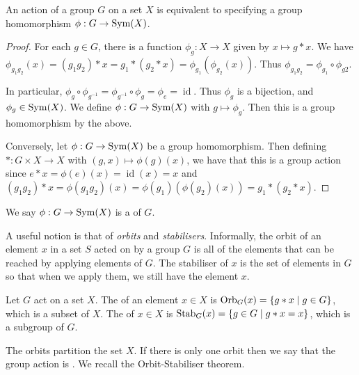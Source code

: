 \documentclass[a4paper]{scrreprt}
\begin{document}
\begin{proposition}
	An action of a group $G$ on a set $X$ is equivalent to specifying a group homomorphism $\phi: G \rightarrow \operatorname{Sym}(X)$.
\end{proposition}
\begin{proof}
	For each $g \in G$, there is a function $\phi_g : X \rightarrow X$ given by $x \mapsto g * x$. We have $\phi_{g_1 g_2}(x) = (g_1 g_2) * x = g_1 * (g_2 * x) = \phi_{g_1} (\phi_{g_2}(x))$. Thus $\phi_{g_1 g_2} = \phi_{g_1} \circ \phi_{g2}$.
	
	In particular, $\phi_g \circ \phi_{g^{-1}} = \phi_{g^{-1}} \circ \phi_g = \phi_e = \operatorname{id}$. Thus $\phi_g$ is a bijection, and $\phi_g \in \operatorname{Sym}(X)$. We define $\phi : G \rightarrow \operatorname{Sym}(X)$ with $g \mapsto \phi_g$. Then this is a group homomorphism by the above.
	
	Conversely, let $\phi : G \rightarrow \operatorname{Sym}(X)$ be a group homomorphism. Then defining $*: G \times X \rightarrow X$ with $(g, x) \mapsto \phi(g)(x)$, we have that this is a group action since $e * x = \phi(e)(x) = \operatorname{id}(x) = x$ and $(g_1 g_2) * x = \phi(g_1 g_2)(x) = \phi(g_1)(\phi(g_2)(x)) = g_1 * (g_2 * x)$.
\end{proof}

\begin{definition}
	We say $\phi: G \rightarrow \operatorname{Sym}(X)$ is a  of $G$.
\end{definition}


A useful notion is that of \emph{orbits} and \emph{stabilisers}. Informally, the orbit of an element $x$ in a set $S$ acted on by a group $G$ is all of the elements that can be reached by applying elements of $G$. The stabiliser of $x$ is the set of elements in $G$ so that when we apply them, we still have the element $x$.

\begin{definition}
	Let $G$ act on a set $X$. The  of an element $x \in X$ is $\operatorname{Orb}_G(x) = \{ g * x \mid g \in G \}$, which is a subset of $X$. The  of $x \in X$ is $\operatorname{Stab}_G(x) = \{ g \in G \mid g * x = x \}$, which is a subgroup of $G$.
\end{definition}

The orbits partition the set $X$. If there is only one orbit then we say that the group action is .
We recall the Orbit-Stabiliser theorem.
\end{document}
